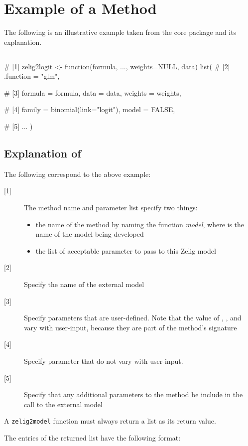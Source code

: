 \section{Example of a  Method}

The following is an illustrative example taken from the  core package and its explanation.


\subsection{}

\begin{Code}
# [1]
zelig2logit <- function(formula, ..., weights=NULL, data)
  list(
       # [2]
       .function = "glm",
        
       # [3]
       formula = formula,
       data    = data,
       weights = weights,
       
       # [4]
       family = binomial(link="logit"),
       model  = FALSE,
       
       # [5]
       ...
       )
\end{Code}


\subsection{Explanation of }

The following correspond to the above example:

\begin{description}
	\item[{[1]}] The method name and parameter list specify two things:
	\begin{itemize}
		\item the name of the  method by naming the function \emph{model}, where  is the name of the model being developed
		\item the list of acceptable parameter to pass to this Zelig model
	\end{itemize}
	\item[{[2]}] Specify the name of the external model
	\item[{[3]}] Specify parameters that are user-defined. Note that the value of , , and  vary with user-input, because they are part of the  method's signature
	\item[{[4]}] Specify parameter that do not vary with user-input.
	\item[{[5]}] Specify that any additional parameters to the  method be include in the call to the external model
\end{description}

A {\tt zelig2model} function must always return a list as its return value.

The entries of the returned list have the following format:



